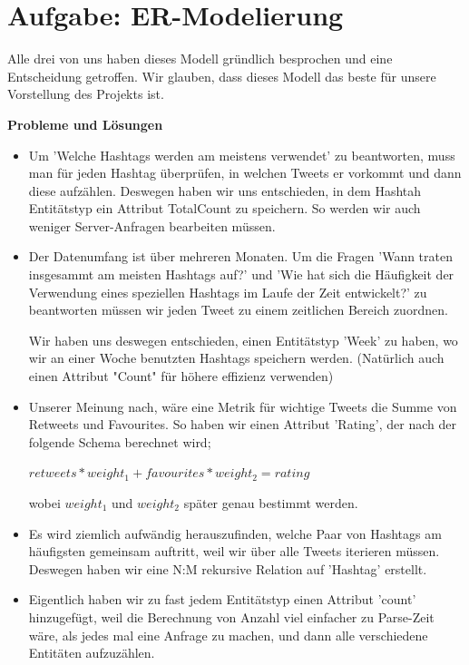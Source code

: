 \section{Aufgabe: ER-Modelierung}

Alle drei von uns haben dieses Modell gründlich besprochen und eine Entscheidung getroffen. Wir glauben, dass dieses Modell das beste für unsere Vorstellung des Projekts ist.

\textbf{Probleme und Lösungen}\\

\begin{itemize}
 \item Um 'Welche Hashtags werden am meistens verwendet' zu beantworten, muss man für jeden Hashtag überprüfen, in welchen Tweets er vorkommt und dann diese aufzählen. Deswegen haben wir uns entschieden, in dem Hashtah Entitätstyp ein Attribut TotalCount zu speichern. So werden wir auch weniger Server-Anfragen bearbeiten müssen.
 
 \item Der Datenumfang ist über mehreren Monaten. Um die Fragen 'Wann traten insgesammt am meisten Hashtags auf?' und 'Wie hat sich die Häufigkeit der Verwendung eines speziellen Hashtags im Laufe der Zeit entwickelt?' zu beantworten müssen wir jeden Tweet zu einem zeitlichen Bereich zuordnen. 
 
 Wir haben uns deswegen entschieden, einen Entitätstyp 'Week' zu haben, wo wir an einer Woche benutzten Hashtags speichern werden. (Natürlich auch einen Attribut "Count" für höhere effizienz verwenden)
 
 \item Unserer Meinung nach, wäre eine Metrik für wichtige Tweets die Summe von Retweets und Favourites. So haben wir einen Attribut 'Rating', der nach der folgende Schema berechnet wird;
 
 \begin{center}
 $retweets*weight_1 + favourites*weight_2 = rating$ 
 \end{center}
 
 wobei $weight_1$ und $weight_2$ später genau bestimmt werden.

 \item Es wird ziemlich aufwändig herauszufinden, welche Paar von Hashtags am häufigsten gemeinsam auftritt, weil wir über alle Tweets iterieren müssen. Deswegen haben wir eine N:M rekursive Relation auf 'Hashtag' erstellt.
 
 \item Eigentlich haben wir zu fast jedem Entitätstyp einen Attribut 'count' hinzugefügt, weil die Berechnung von Anzahl viel einfacher zu Parse-Zeit wäre, als jedes mal eine Anfrage zu machen, und dann alle verschiedene Entitäten aufzuzählen.
 
\end{itemize}


